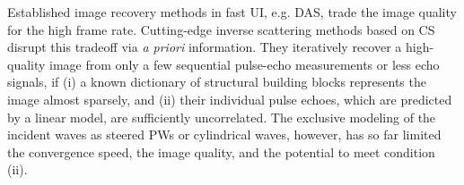Established image recovery methods in
fast \acl{UI}, e.g.
\acl{DAS}, trade
the image quality for
the high frame rate.
Cutting-edge inverse scattering methods based on
\ac{CS} disrupt
this tradeoff via
\emph{a priori} information.
They iteratively recover
a high-quality image from
only a few sequential pulse-echo measurements or
less echo signals, if
(i) a known dictionary of
structural building blocks represents
the image almost sparsely, and
(ii) their individual pulse echoes, which are predicted by
a linear model, are
sufficiently uncorrelated.
The exclusive modeling of
the incident waves as
steered \aclp{PW} or
cylindrical waves, however, has so far limited
the convergence speed,
the image quality, and
the potential to meet
condition (ii).

